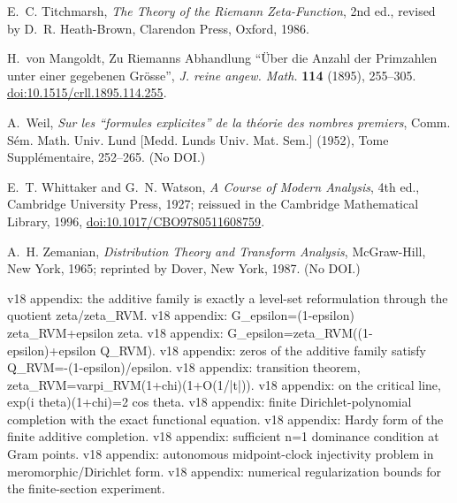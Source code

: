 \documentclass[11pt,reqno]{amsart}
\numberwithin{equation}{section}
\theoremstyle{plain}
\theoremstyle{definition}
\theoremstyle{remark}
\begin{document}
\begin{thebibliography}{99}
E.~C. Titchmarsh, \emph{The Theory of the Riemann Zeta-Function}, 2nd ed., revised by D.~R. Heath-Brown, Clarendon Press, Oxford, 1986.

H.~von Mangoldt, Zu Riemanns Abhandlung ``\"Uber die Anzahl der Primzahlen unter einer gegebenen Gr\"osse'', \emph{J. reine angew. Math.} \textbf{114} (1895), 255--305.
\href{https://doi.org/10.1515/crll.1895.114.255}{doi:10.1515/crll.1895.114.255}.

A.~Weil, \emph{Sur les ``formules explicites'' de la th\'eorie des nombres premiers}, Comm. S\'em. Math. Univ. Lund [Medd. Lunds Univ. Mat. Sem.] (1952), Tome Suppl\'ementaire, 252--265. (No DOI.)

E.~T. Whittaker and G.~N. Watson, \emph{A Course of Modern Analysis}, 4th ed., Cambridge University Press, 1927; reissued in the Cambridge Mathematical Library, 1996, \href{https://doi.org/10.1017/CBO9780511608759}{doi:10.1017/CBO9780511608759}.

A.~H. Zemanian, \emph{Distribution Theory and Transform Analysis}, McGraw-Hill, New York, 1965; reprinted by Dover, New York, 1987. (No DOI.)

\end{thebibliography}


\clearpage
\makeatletter
\expandafter\gdef\csname CGTip@prop:additive-level-v18\endcsname{v18 appendix: the additive family is exactly a level-set reformulation through the quotient zeta/zeta_RVM.}
\expandafter\gdef\csname CGTip@eq:additive-family-v18\endcsname{v18 appendix: G_epsilon=(1-epsilon) zeta_RVM+epsilon zeta.}
\expandafter\gdef\csname CGTip@eq:additive-level-v18\endcsname{v18 appendix: G_epsilon=zeta_RVM((1-epsilon)+epsilon Q_RVM).}
\expandafter\gdef\csname CGTip@eq:Q-negative-level-v18\endcsname{v18 appendix: zeros of the additive family satisfy Q_RVM=-(1-epsilon)/epsilon.}
\expandafter\gdef\csname CGTip@eq:rvm-first-rs-v18\endcsname{v18 appendix: transition theorem, zeta_RVM=varpi_RVM(1+chi)(1+O(1/|t|)).}
\expandafter\gdef\csname CGTip@eq:first-rs-hardy-v18\endcsname{v18 appendix: on the critical line, exp(i theta)(1+chi)=2 cos theta.}
\expandafter\gdef\csname CGTip@eq:finite-additive-v18\endcsname{v18 appendix: finite Dirichlet-polynomial completion with the exact functional equation.}
\expandafter\gdef\csname CGTip@eq:finite-additive-hardy-v18\endcsname{v18 appendix: Hardy form of the finite additive completion.}
\expandafter\gdef\csname CGTip@eq:dominance-v18\endcsname{v18 appendix: sufficient n=1 dominance condition at Gram points.}
\expandafter\gdef\csname CGTip@eq:clock-injectivity-v18\endcsname{v18 appendix: autonomous midpoint-clock injectivity problem in meromorphic/Dirichlet form.}
\expandafter\gdef\csname CGTip@eq:bounded-section-v18\endcsname{v18 appendix: numerical regularization bounds for the finite-section experiment.}
\makeatother
\end{document}
